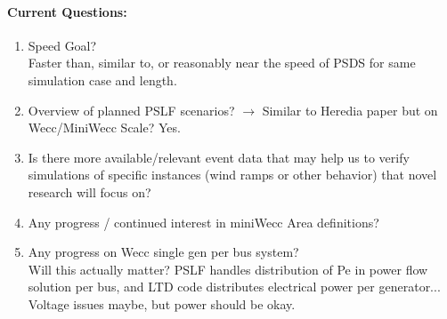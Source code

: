 \documentclass[12pt]{article}
\begin{document}
\begin{multicols}{2}
	\paragraph{Current Questions:}
	\begin{enumerate}
	 	\item Speed Goal? \\
	 	Faster than, similar to, or reasonably near the speed of PSDS for same simulation case and length.
		
		\item Overview of planned PSLF scenarios? $\rightarrow$ Similar to Heredia paper but on Wecc/MiniWecc Scale? Yes.
		
		\item Is there more available/relevant event data that may help us to verify simulations of specific instances (wind ramps or other behavior) that novel research will focus on? %

		\item  Any progress / continued interest in miniWecc Area definitions?

		\item Any progress on Wecc single gen per bus system?
		\\ Will this actually matter? PSLF handles distribution of Pe in power flow solution per bus, and LTD code distributes electrical power per generator... Voltage issues maybe, but power should be okay.
		
		
	\end{enumerate}

\vfill\null

\end{multicols}
\end{document}

